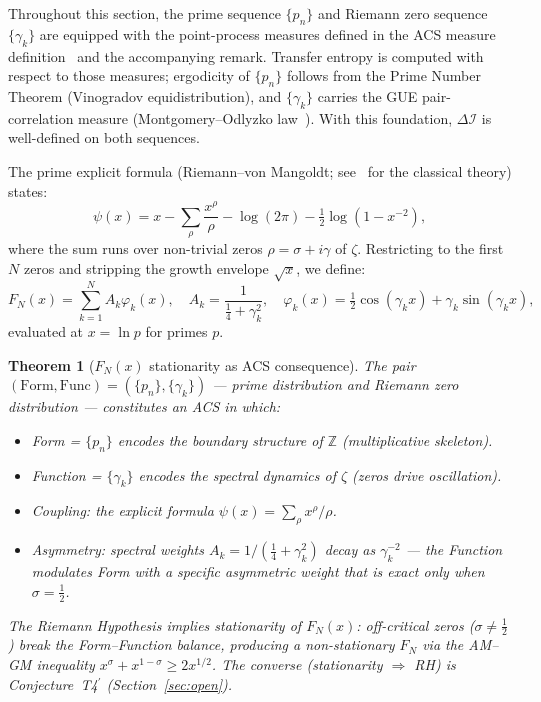 \documentclass[11pt,a4paper]{article}
\theoremstyle{plain}
\newtheorem{theorem}{Theorem}[section]
\theoremstyle{definition}
\theoremstyle{remark}
\newcommand{\DI}{\Delta\mathcal{I}}
\begin{document}
Throughout this section, the prime sequence $\{p_n\}$ and Riemann zero sequence $\{\gamma_k\}$ are equipped with the point-process measures defined in the ACS measure definition~\cite{Wallace2026a} and the accompanying remark.  Transfer entropy is computed with respect to those measures; ergodicity of $\{p_n\}$ follows from the Prime Number Theorem (Vinogradov equidistribution), and $\{\gamma_k\}$ carries the GUE pair-correlation measure (Montgomery--Odlyzko law~\cite{Montgomery1973,Odlyzko1987}).  With this foundation, $\DI$ is well-defined on both sequences.

The prime explicit formula (Riemann--von Mangoldt; see~\cite{Davenport2000} for the classical theory) states:
\begin{equation}
  \psi(x) = x - \sum_\rho \frac{x^\rho}{\rho} - \log(2\pi) - \tfrac{1}{2}\log(1-x^{-2}),
\end{equation}
where the sum runs over non-trivial zeros $\rho = \sigma + i\gamma$ of $\zeta$.
Restricting to the first $N$ zeros and stripping the growth envelope $\sqrt{x}$, 
we define:
\begin{equation}
  F_N(x) = \sum_{k=1}^N A_k \varphi_k(x), 
  \quad A_k = \frac{1}{\tfrac{1}{4}+\gamma_k^2}, 
  \quad \varphi_k(x) = \tfrac{1}{2}\cos(\gamma_k x) + \gamma_k\sin(\gamma_k x),
\end{equation}
evaluated at $x = \ln p$ for primes $p$.

\begin{theorem}[$F_N(x)$ stationarity as ACS consequence]\label{thm:FN-acs}\label{thm:T4}
The pair $(\mathrm{Form}, \mathrm{Func}) = (\{p_n\}, \{\gamma_k\})$ --- prime 
distribution and Riemann zero distribution --- constitutes an ACS in which:
\begin{itemize}[noitemsep]
  \item Form = $\{p_n\}$ encodes the boundary structure of $\mathbb{Z}$ 
    (multiplicative skeleton).
  \item Function = $\{\gamma_k\}$ encodes the spectral dynamics of $\zeta$ 
    (zeros drive oscillation).
  \item Coupling: the explicit formula $\psi(x) = \sum_\rho x^\rho/\rho$.
  \item Asymmetry: spectral weights $A_k = 1/(\tfrac{1}{4}+\gamma_k^2)$ 
    decay as $\gamma_k^{-2}$ --- the Function modulates Form with a specific 
    asymmetric weight that is exact only when $\sigma = \tfrac{1}{2}$.
\end{itemize}
The Riemann Hypothesis \emph{implies} stationarity of $F_N(x)$: 
off-critical zeros ($\sigma \neq \tfrac{1}{2}$) break the 
Form--Function balance, producing a non-stationary $F_N$ via the 
AM--GM inequality $x^\sigma + x^{1-\sigma} \geq 2x^{1/2}$. 
The converse (stationarity $\Rightarrow$ RH) is Conjecture~T4$^\prime$ 
(Section~\ref{sec:open}).
\end{theorem}
\end{document}
